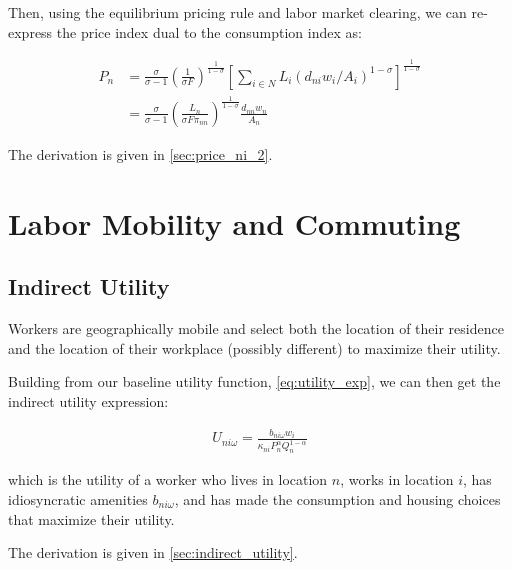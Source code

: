 \documentclass[10pt]{article}
\begin{document}
Then, using the equilibrium pricing rule
and labor market clearing, we can 
re-express the price index dual to the consumption index as:

\begin{align}
    P_n & =\frac{\sigma}{\sigma-1}\left(\frac{1}{\sigma F}\right)^{\frac{1}{1-\sigma}}\left[\sum_{i \in N} L_i\left(d_{n i} w_i / A_i\right)^{1-\sigma}\right]^{\frac{1}{1-\sigma}} \\
    & =\frac{\sigma}{\sigma-1}\left(\frac{L_n}{\sigma F \pi_{n n}}\right)^{\frac{1}{1-\sigma}} \frac{d_{n n} w_n}{A_n} \label{eq:price_index_p_n_2}
\end{align}

The derivation is given in \autoref{sec:price_ni_2}.


\section{Labor Mobility and Commuting}

\subsection{Indirect Utility}

Workers are geographically mobile and select 
both the location of their residence and the location of 
their workplace (possibly different) to maximize their 
utility. 

Building from our baseline utility function,
\eqref{eq:utility_exp}, we can 
then get the indirect utility expression:

\begin{align}
    U_{n i \omega}=\frac{b_{n i \omega} w_i}{\kappa_{n i} P_n^\alpha Q_n^{1-\alpha}} \label{eq:indirect_utility}
\end{align}

which is the utility of a worker who lives in location $n$,
works in location $i$, has idiosyncratic amenities $b_{n i \omega}$,
and has made the consumption and housing choices that
maximize their utility.

The derivation is given in \autoref{sec:indirect_utility}.

\end{document}
